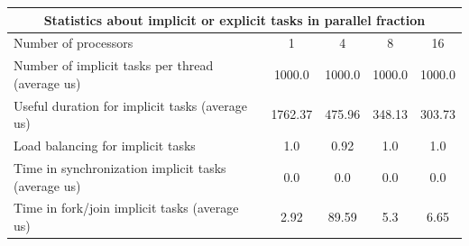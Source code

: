 \begin{tabular}{|l|c|c|c|c|}
\hline
\multicolumn{5}{|c|}{Statistics about implicit or explicit tasks in parallel fraction} \\
\hline
\hline
Number of processors & 1 & 4 & 8 & 16 \\
\hline
\hline
Number of implicit tasks per thread (average us)    &          1000.0 &          1000.0 &          1000.0 &          1000.0 \\
\hline
Useful duration for implicit tasks (average us)     &         1762.37 &          475.96 &          348.13 &          303.73 \\
\hline
Load balancing for implicit tasks                &             1.0 &            0.92 &             1.0 &             1.0 \\
\hline
Time in synchronization implicit tasks (average us) &             0.0 &             0.0 &             0.0 &             0.0 \\
\hline
Time in fork/join implicit tasks (average us)       &            2.92 &           89.59 &             5.3 &            6.65 \\
\hline
\end{tabular}
